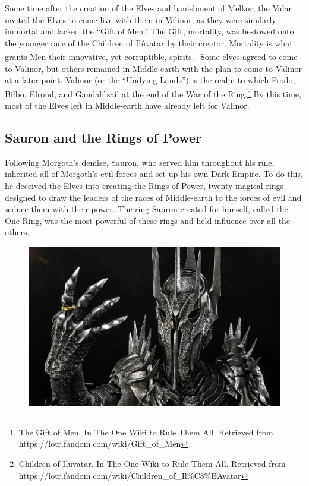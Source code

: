 \documentclass[10pt, letterpaper]{article}
\begin{document}
    \noindent Some time after the creation of the Elves and banishment of Melkor, the Valar invited the Elves to come live with them in Valinor, as they were similarly immortal and lacked the “Gift of Men.” The Gift, mortality, was bestowed onto the younger race of the Children of Ilúvatar by their creator. Mortality is what grants Men their innovative, yet corruptible, spirits.\footnote{The Gift of Men. In The One Wiki to Rule Them All. Retrieved from https://lotr.fandom.com/wiki/Gift\_of\_Men}  Some elves agreed to come to Valinor, but others remained in Middle-earth with the plan to come to Valinor at a later point. Valinor (or the “Undying Lands”) is the realm to which Frodo, Bilbo, Elrond, and Gandalf sail at the end of the War of the Ring.\footnote{Children of Iluvatar. In The One Wiki to Rule Them All. Retrieved from https://lotr.fandom.com/wiki/Children\_of\_Il\%C3\%BAvatar} By this time, most of the Elves left in Middle-earth have already left for Valinor. \\
   
\subsection{Sauron and the Rings of Power}
    
\noindent Following Morgoth’s demise, Sauron, who served him throughout his rule, inherited all of Morgoth’s evil forces and set up his own Dark Empire. To do this, he deceived the Elves into creating the Rings of Power, twenty magical rings designed to draw the leaders of the races of Middle-earth to the forces of evil and seduce them with their power. The ring Sauron created for himself, called the One Ring, was the most powerful of these rings and held influence over all the others. \\

  \begin{figure}
        \centering
        \includegraphics[scale = 0.25]{image6.png}
    \end{figure}
  
\end{document}
